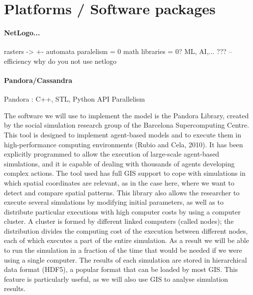 \documentclass[11pt,oneside,a4paper,openright]{report}
\begin{document}

\chapter{Platforms / Software packages}
		\subsubsection{NetLogo...}

		    rasters -> +- automata
		    paralelism = 0
		    math libraries = 0?
		    ML, AI,... ???
		    -- efficiency
		    why do you not use netlogo

		\subsubsection{Pandora/Cassandra}

		Pandora : C++, STL, Python API
		Parallelism %
	      
		The software we will use to implement the model is the Pandora Library, created by the social simulation
		research group of the Barcelona Supercomputing Centre. This tool is designed to implement agent-based 
		models and to execute them in high-performance computing environments (Rubio and Cela, 2010). It has been 
		explicitly programmed to allow the execution of large-scale agent-based simulations, and it is capable of 
		dealing with thousands of agents developing complex actions. The tool used has full GIS support to cope 
		with simulations in which spatial coordinates are relevant, as in the case here, where we want to detect 
		and compare spatial patterns. This library also allows the researcher to execute several simulations by 
		modifying initial parameters, as well as to distribute particular executions with high computer costs by 
		using a computer cluster. A cluster is formed by different linked computers (called nodes); the distribution 
		divides the computing cost of the execution between different nodes, each of which executes a part of the 
		entire simulation. As a result we will be able to run the simulation in a fraction of the time that would 
		be needed if we were using a single computer. The results of each simulation are stored in hierarchical data 
		format (HDF5), a popular format that can be loaded by most GIS. This feature is particularly useful, as we 
		will also use GIS to analyse simulation results.
\end{document}
